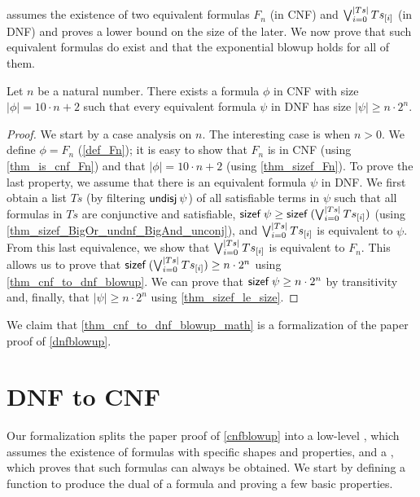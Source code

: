 \documentclass[a4paper,USenglish,cleveref, autoref, thm-restate]{lipics-v2021}
\theoremstyle{definition}
\begin{document}
 assumes the existence of two equivalent formulas $F_n$ (in CNF) and $\bigvee_{i = 0}^{\left|Ts\right|} {Ts}_{[i]}$ (in DNF) and proves a lower bound on the size of the later.
We now prove that such equivalent formulas do exist and that the exponential blowup holds for all of them.

\begin{theorem}
  \label{thm_cnf_to_dnf_blowup_math}
  Let $n$ be a natural number.
  There exists a formula $\phi$ in CNF with size $\left|\phi\right| = 10 \cdot n + 2$ such that every equivalent formula $\psi$ in DNF has size $\left|\psi\right| \ge n \cdot 2^n$.
\end{theorem}
\begin{proof}
  We start by a case analysis on $n$.
  The interesting case is when $n > 0$.
  We define $\phi = F_n$ (\cref{def_Fn});
  it is easy to show that $F_n$ is in CNF (using \cref{thm_is_cnf_Fn}) and that $\left|\phi\right| = 10 \cdot n + 2$ (using \cref{thm_sizef_Fn}).
  To prove the last property, we assume that there is an equivalent formula $\psi$ in DNF.
  We first obtain a list $Ts$ (by filtering $\mathsf{undisj} \> \psi$) of all satisfiable terms in $\psi$ such that
  all formulas in $Ts$ are conjunctive and satisfiable,
  $\mathsf{sizef} \> \psi \ge \mathsf{sizef} \> (\bigvee_{i = 0}^{\left|Ts\right|} {Ts}_{[i]})$ (using \cref{thm_sizef_BigOr_undnf_BigAnd_unconj}),
  and $\bigvee_{i = 0}^{\left|Ts\right|} {Ts}_{[i]}$ is equivalent to $\psi$.
  From this last equivalence, we show that $\bigvee_{i = 0}^{\left|Ts\right|} {Ts}_{[i]}$ is equivalent to $F_n$.
  This allows us to prove that $\mathsf{sizef} \> (\bigvee_{i = 0}^{\left|Ts\right|} {Ts}_{[i]}) \ge n \cdot 2^n$ using \cref{thm_cnf_to_dnf_blowup}.
  We can prove that $\mathsf{sizef} \> \psi \ge n \cdot 2^n$ by transitivity and, finally, that $\left|\psi\right| \ge n \cdot 2^n$ using \cref{thm_sizef_le_size}.
\end{proof}

We claim that \cref{thm_cnf_to_dnf_blowup_math} is a formalization of the paper proof of \cref{dnfblowup}.


\section{DNF to CNF}
\label{sec_DNF_to_CNF}

Our formalization splits the paper proof of \cref{cnfblowup} into a low-level , which assumes the existence of formulas with specific shapes and properties, and a , which proves that such formulas can always be obtained.
We start by defining a function to produce the dual of a formula and proving a few basic properties.
\end{document}
